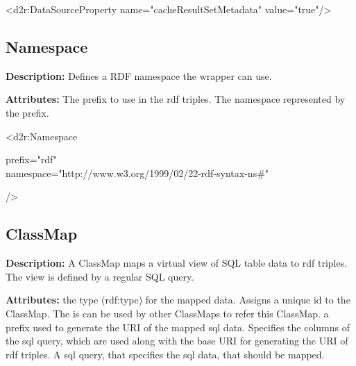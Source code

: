 \begin{ExampleBox}
	<d2r:DataSourceProperty name="cacheResultSetMetadata" value="true"/>
\end{ExampleBox}


\subsection{Namespace}
\textbf{Description:} \newline
Defines a RDF namespace the wrapper can use.

\textbf{Attributes:} \newline
{}
The prefix to use in the rdf triples.
\EndAttribute
{}
The namespace represented by the prefix.
\EndAttribute

\begin{ExampleBox}
	<d2r:Namespace 
	\begin{indention}{1cm}
		prefix="rdf"\\
		namespace="http://www.w3.org/1999/02/22-rdf-syntax-ns\#"
	\end{indention}
	/>
\end{ExampleBox}

\subsection{ClassMap}
\textbf{Description:} \newline
A ClassMap maps a virtual view of SQL table data to rdf triples. The view is defined by a regular SQL query.

\textbf{Attributes:} \newline
{}
the type (rdf:type) for the mapped data.
\EndAttribute
{}
Assigns a unique id to the ClassMap. The is can be used by other ClassMaps to refer this ClassMap.
\EndAttribute
{}
a prefix used to generate the URI of the mapped sql data.
\EndAttribute
{}
Specifies the columns of the sql query, which are used along with the base URI for generating the URI of rdf triples.
\EndAttribute
{}
A sql query, that specifies the sql data, that should be mapped.
\EndAttribute

